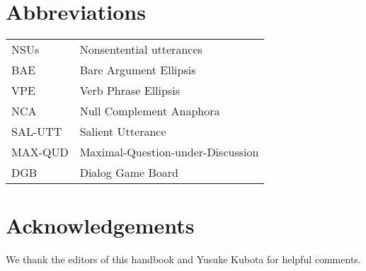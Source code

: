 {\section*{Abbreviations}

\begin{tabularx}{.99\textwidth}{@{}lX}
NSUs & Nonsentential utterances\\
BAE & Bare Argument Ellipsis\\
VPE & Verb Phrase Ellipsis\\
NCA & Null Complement Anaphora\\
SAL-UTT & Salient Utterance\\
MAX-QUD & Maximal-Question-under-Discussion\\
DGB & Dialog Game Board\\
\end{tabularx}


\section*{Acknowledgements}
We thank the editors of this handbook and Yusuke Kubota for helpful comments.

{\sloppy
\printbibliography[heading=subbibliography,notkeyword=this]
}
%
}%



